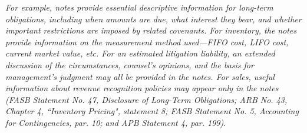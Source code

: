 \documentclass[a4paper]{article}
\begin{document}
\begin{spacing}{2}
\begin{singlespace}
	\indent \textit{For example, notes provide essential descriptive information for long-term obligations, including when amounts are due, what interest they bear, and whether important restrictions are imposed by related covenants. For inventory, the notes provide information on the measurement method used---FIFO cost, LIFO cost, current market value, etc. For an estimated litigation liability, an extended discussion of the circumstances, counsel's opinions, and the basis for management's judgment may all be provided in the notes. For sales, useful information about revenue recognition policies may appear only in the notes (FASB Statement No. 47, Disclosure of Long-Term Obligations; ARB No. 43, Chapter 4, ``Inventory Pricing", statement 8; FASB Statement No. 5, Accounting for Contingencies, par. 10; and APB Statement 4, par. 199)}.
\end{singlespace}


\end{spacing}
\end{document}

